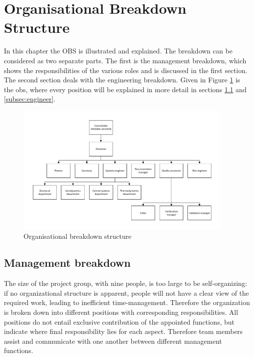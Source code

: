\section{Organisational Breakdown Structure}\label{cha:OBS}
In this chapter the \gls{OBS} is illustrated and explained. The breakdown can be considered as two separate parts. The first is the management breakdown, which shows the responsibilities of the various roles and is discussed in the first section. The second section deals with the engineering breakdown. Given in Figure \ref{fig:OBS} is the \gls{obs}, where every position will be explained in more detail in sections \ref{subsec:management} and \ref{subsec:engineer}.

\begin{figure}[h]
\centering
\includegraphics[width=0.95\textwidth]{./Figure/OBS.pdf}
\caption{Organisational breakdown structure} \label{fig:OBS}
\end{figure}

\subsection{Management breakdown}\label{subsec:management}
The size of the project group, with nine people, is too large to be self-organizing: if no organizational structure is apparent, people will not have a clear view of the required work, leading to inefficient time-management. Therefore the organization is broken down into different positions with corresponding responsibilities. All positions do not entail exclusive contribution of the appointed functions, but indicate where final responsibility lies for each aspect. Therefore team members assist and communicate with one another between different management functions.


